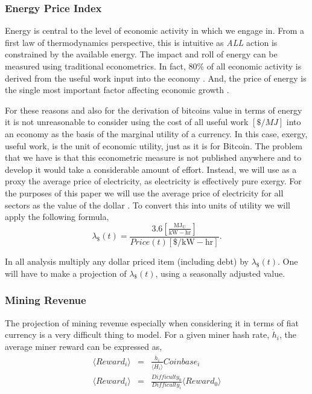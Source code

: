 \documentclass[runningheads]{llncs}
\begin{document}
\subsubsection{Energy Price Index}
Energy is central to the level of economic activity in which we engage in.
From a first law of thermodynamics perspective, this is intuitive as \emph{ALL} action is constrained by the available energy.
The impact and roll of energy can be measured using traditional econometrics.
In fact, 80\% of all economic activity is derived from the useful work input into the economy \cite{ayers2009engine}.
And, the price of energy is the single most important factor affecting economic growth \cite{ayers2009engine}.

For these reasons and also for the derivation of bitcoins value in terms of energy it is not unreasonable to consider using the cost of all useful work $[\$/MJ]$ into an economy as the basis of the marginal utility of a currency.
In this case, exergy, useful work, is the unit of economic utility, just as it is for Bitcoin.
The problem that we have is that this econometric measure is not published anywhere and to develop it would take a considerable amount of effort.
Instead, we will use as a proxy the average price of electricity, as electricity is effectively pure exergy.
For the purposes of this paper we will use the average price of electricity for all sectors as the value of the dollar \cite{eia2021browser}.
To convert this into units of utility we will apply the following formula,
\begin{equation}
    \lambda_{\$}(t) = \frac{3.6[\frac{\mathrm{MJ_U}}{\mathrm{kW-hr}}]}{Price(t)[\$/\mathrm{kW-hr}]}.\label{eq:10}
\end{equation}

In all analysis multiply any dollar priced item (including debt) by $\lambda_{\$}(t)$.
One will have to make a projection of $\lambda_{\$}(t)$, using a seasonally adjusted value.

\subsubsection{Mining Revenue}
The projection of mining revenue especially when considering it in terms of fiat currency is a very difficult thing to model.
For a given miner hash rate, $\dot{h}_i$, the average miner reward can be expressed as,
\begin{eqnarray}
    \langle Reward_i \rangle & = & \frac{\dot{h}_i}{\langle \dot{H}_i \rangle} Coinbase_i \\
    \langle Reward_i \rangle & = & \frac{Difficulty_0}{Difficulty_i}\langle Reward_0 \rangle
\end{eqnarray}
\end{document}
